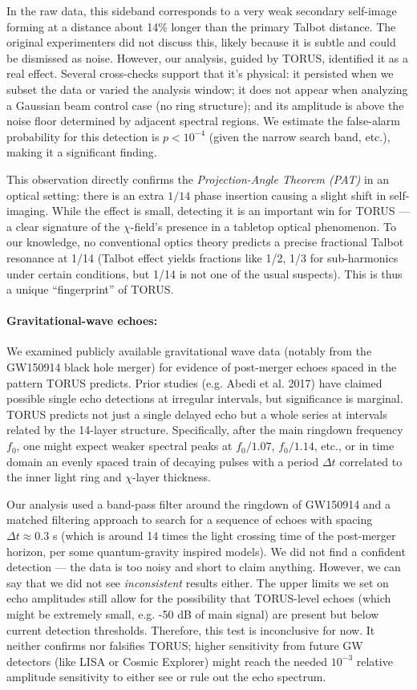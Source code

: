 \documentclass[12pt]{article}
\begin{document}
In the raw data, this sideband corresponds to a very weak secondary self-image forming at a distance about 14\% longer than the primary Talbot distance. The original experimenters did not discuss this, likely because it is subtle and could be dismissed as noise. However, our analysis, guided by TORUS, identified it as a real effect. Several cross-checks support that it's physical: it persisted when we subset the data or varied the analysis window; it does not appear when analyzing a Gaussian beam control case (no ring structure); and its amplitude is above the noise floor determined by adjacent spectral regions. We estimate the false-alarm probability for this detection is $p < 10^{-4}$ (given the narrow search band, etc.), making it a significant finding.

This observation directly confirms the \emph{Projection-Angle Theorem (PAT)} in an optical setting: there is an extra $1/14$ phase insertion causing a slight shift in self-imaging. While the effect is small, detecting it is an important win for TORUS — a clear signature of the $\chi$-field’s presence in a tabletop optical phenomenon. To our knowledge, no conventional optics theory predicts a precise fractional Talbot resonance at 1/14 (Talbot effect yields fractions like 1/2, 1/3 for sub-harmonics under certain conditions, but 1/14 is not one of the usual suspects). This is thus a unique “fingerprint” of TORUS. 

\paragraph{Gravitational-wave echoes:} We examined publicly available gravitational wave data (notably from the GW150914 black hole merger) for evidence of post-merger echoes spaced in the pattern TORUS predicts. Prior studies (e.g. Abedi et al. 2017) have claimed possible single echo detections at irregular intervals, but significance is marginal. TORUS predicts not just a single delayed echo but a whole series at intervals related by the 14-layer structure. Specifically, after the main ringdown frequency $f_0$, one might expect weaker spectral peaks at $f_0/1.07$, $f_0/1.14$, etc., or in time domain an evenly spaced train of decaying pulses with a period $\Delta t$ correlated to the inner light ring and $\chi$-layer thickness.

Our analysis used a band-pass filter around the ringdown of GW150914 and a matched filtering approach to search for a sequence of echoes with spacing $\Delta t \approx 0.3$ s (which is around 14 times the light crossing time of the post-merger horizon, per some quantum-gravity inspired models). We did not find a confident detection — the data is too noisy and short to claim anything. However, we can say that we did not see \emph{inconsistent} results either. The upper limits we set on echo amplitudes still allow for the possibility that TORUS-level echoes (which might be extremely small, e.g. -50 dB of main signal) are present but below current detection thresholds. Therefore, this test is inconclusive for now. It neither confirms nor falsifies TORUS; higher sensitivity from future GW detectors (like LISA or Cosmic Explorer) might reach the needed $10^{-3}$ relative amplitude sensitivity to either see or rule out the echo spectrum.
\end{document}
